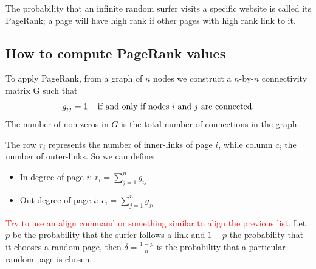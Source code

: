 \documentclass[]{usiinfbachelorproject}
\newcommand\tab[1][1cm]{\hspace*{#1}}
\begin{document}
The probability that an infinite random surfer visits a specific website is called its PageRank; a page will have high rank if other pages with high rank link to it.


\subsection{How to compute PageRank values}
To apply PageRank, from a graph of $n$ nodes we construct a $n$-by-$n$ connectivity matrix G such that
\begin{equation*}
g_{ij}=1 \text{\;\;\; if and only if nodes $i$ and $j$ are connected.} 
\end{equation*}
The number of non-zeros in $G$ is the total number of connections in the graph.

The row $r_i$ represents the number of inner-links of page $i$, while column $c_i$ the number of outer-links. So we can define:
\begin{itemize}
\item In-degree of page $i$: \tab $r_i = \sum\limits_{j=1}^{n} g_{ij}$
\item Out-degree of page $i$: \tab $c_i = \sum\limits_{j=1}^{n} g_{ji}$
\end{itemize}
\textcolor{red}{Try to use an align command or something similar to align the previous list.}
Let $p$ be the probability that the surfer follows a link and $1-p$ the probability that it chooses a random page, then $\delta = \frac{1-p}{n}$ is the probability that a particular random page is chosen.
\end{document}
